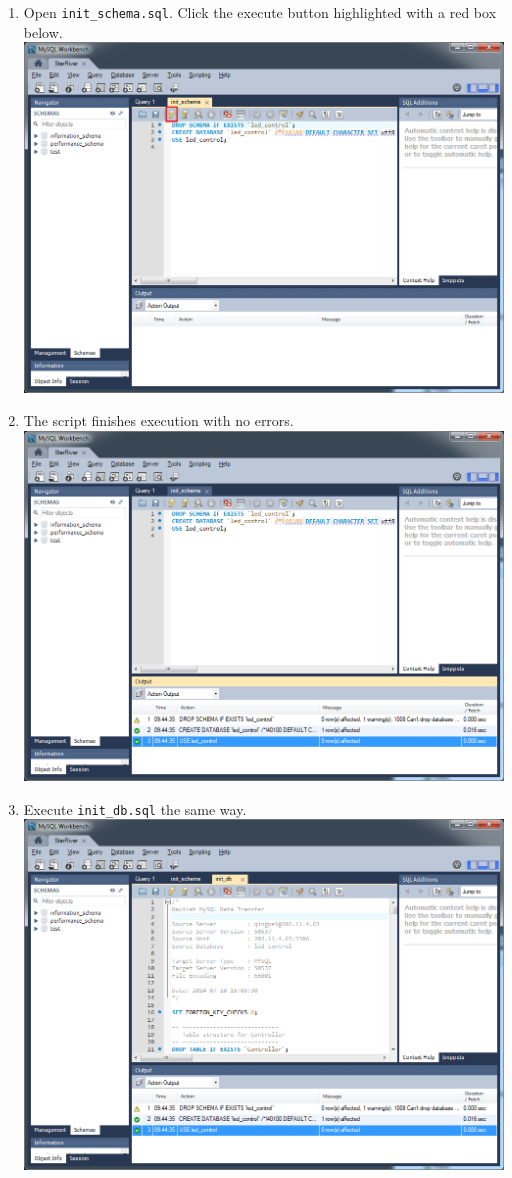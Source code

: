 \begin{enumerate}
\item
  Open \texttt{init\_schema.sql}. Click the execute button highlighted
  with a red box below. \includegraphics{img/db_init_7.png}
\item
  The script finishes execution with no errors.
  \includegraphics{img/db_init_8.png}
\item
  Execute \texttt{init\_db.sql} the same way.
  \includegraphics{img/db_init_9.png}

\end{enumerate}
